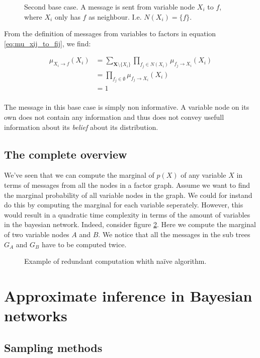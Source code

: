 \begin{figure}[h!]
\centering
{}
\caption{Second base case. A message is sent from variable node $X_i$
to $f$, where $X_i$ only has $f$ as neighbour. I.e. $N(X_i) = \{f\}$.}
\label{fig:message_base_case_2}
\end{figure}

\noindent
From the definition of messages from variables to factors in
equation \ref{eq:mu_xij_to_fij}, we find:

\begin{equation}\begin{split}
\mu_{X_i \rightarrow f}(X_i)
	&= \sum_{\textbf{X}\setminus \{X_i\}} 
		\prod_{f_j \in N(X_i)} \mu_{f_j \rightarrow X_i}(X_i) \\
	&= \prod_{f_j \in \emptyset} \mu_{f_j \rightarrow X_i}(X_i) \\
	&= 1 \\
\end{split}\end{equation}

\noindent
The message in this base case is simply non informative. A variable node
on its own does not contain any information and thus does not
convey usefull information about its \textit{belief} about its
distribution.

\subsection{The complete overview}
We've seen that we can compute the marginal of $p(X)$ of any 
variable $X$ in terms of messages from all the nodes in a factor
graph. Assume we want to find the marginal probability of all
variable nodes in the graph. We could for instand do this 
by computing the marginal for each variable seperately.
However, this would result in a quadratic time complexity
in terms of the amount of variables in the bayesian network.
Indeed, consider figure \ref{fig:sum_prod_innef}. Here we compute
the marginal of two variable nodes $A$ and $B$. We notice that
all the messages in the sub trees $G_A$ and $G_B$ have to be computed
twice.

\begin{figure}[h!]
\centering

\caption{Example of redundant computation whith na\"ive algorithm.}
\label{fig:sum_prod_innef}
\end{figure}
\section{Approximate inference in Bayesian networks}
\subsection{Sampling methods}
